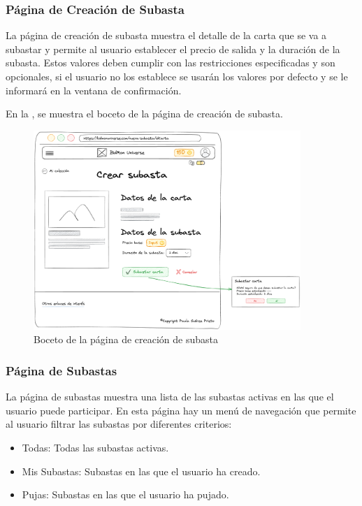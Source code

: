 \subsubsection{Página de Creación de Subasta}
La página de creación de subasta muestra el detalle de la carta que se va a subastar y permite al usuario establecer el precio de salida y la duración de la subasta.
Estos valores deben cumplir con las restricciones especificadas y son opcionales, si el usuario no los establece se usarán los valores por defecto y se le informará en la ventana de confirmación.

En la , se muestra el boceto de la página de creación de subasta.
\begin{figure}[H]
    \centering
    \includegraphics[width=0.9\textwidth]{figures/6-Analisis/6-Interfaz/prototipos/crear-subasta.png}
    \caption{Boceto de la página de creación de subasta}
    \label{fig:p_create_auction}
    \hypertarget{fig:p_create_auction}{}
\end{figure}


\subsubsection{Página de Subastas}
La página de subastas muestra una lista de las subastas activas en las que el usuario puede participar.
En esta página hay un menú de navegación que permite al usuario filtrar las subastas por diferentes criterios:
\begin{itemize}
    \item Todas: Todas las subastas activas.
    \item Mis Subastas: Subastas en las que el usuario ha creado.
    \item Pujas: Subastas en las que el usuario ha pujado.
\end{itemize}


